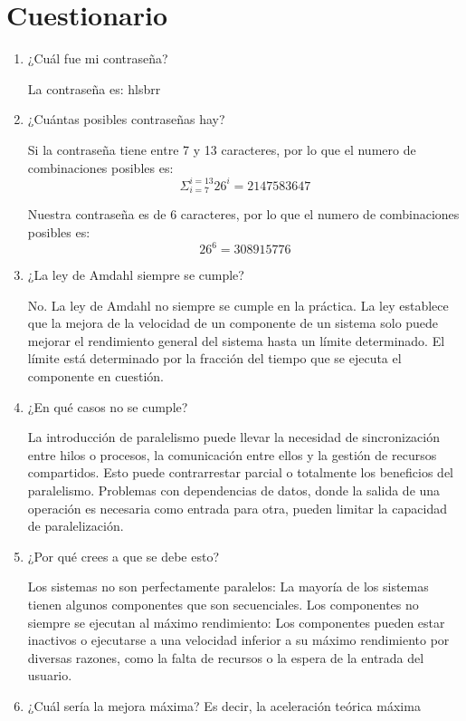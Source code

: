 \documentclass{article}
\begin{document}
\section{Cuestionario}
\begin{enumerate}
    \item ¿Cuál fue mi contraseña?
    
    La contraseña es: hlsbrr

    \item ¿Cuántas posibles contraseñas hay?

    Si la contraseña tiene entre 7 y 13 caracteres, por lo que el numero de combinaciones posibles es:
    \[ \Sigma_{i=7}^{i=13} 26^i = 2 147 583 647\]

    Nuestra contraseña es de 6 caracteres, por lo que el numero de combinaciones posibles es:
    \[ 26^6 = 308 915 776\]

    \item ¿La ley de Amdahl siempre se cumple?
    
    No. La ley de Amdahl no siempre se cumple en la práctica. La ley establece que la mejora de la velocidad de un componente de un sistema solo puede mejorar el rendimiento general del sistema hasta un límite determinado. El límite está determinado por la fracción del tiempo que se ejecuta el componente en cuestión.

    \item ¿En qué casos no se cumple?
    
    La introducción de paralelismo puede llevar la necesidad de sincronización entre hilos o procesos, la comunicación entre ellos y la gestión de recursos compartidos. Esto puede contrarrestar parcial o totalmente los beneficios del paralelismo. Problemas con dependencias de datos, donde la salida de una operación es necesaria como entrada para otra, pueden limitar la capacidad de paralelización. 
   
    \item ¿Por qué crees a que se debe esto?
    
    Los sistemas no son perfectamente paralelos: La mayoría de los sistemas tienen algunos componentes que son secuenciales.
    Los componentes no siempre se ejecutan al máximo rendimiento: Los componentes pueden estar inactivos o ejecutarse a una velocidad inferior a su máximo rendimiento por diversas razones, como la falta de recursos o la espera de la entrada del usuario.

    \item ¿Cuál sería la mejora máxima? Es decir, la aceleración teórica máxima
    

\end{enumerate}
\end{document}
